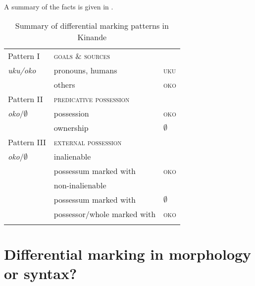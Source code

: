 \documentclass[output=paper]{langscibook}
\begin{document}
A summary of the facts is given in .

\begin{table}
\caption{Summary of differential marking patterns in Kinande}
\label{tab:schneider:SummaryDifferentialMarkingKinande}
 \begin{tabular}{lll}
  \lsptoprule
           Pattern I &  \textsc{goals \& sources} & \\
  \textit{uku/oko} & pronouns, humans & \textsc{uku}\\
  & others & \textsc{oko}\\
  \midrule
   Pattern II &  \textsc{predicative possession} & \\
   \textit{oko}/$\emptyset$ & possession & \textsc{oko} \\
   &  ownership & $\emptyset$\\
   \midrule
    Pattern III &  \textsc{external possession} & \\
    \textit{oko}/$\emptyset$ & inalienable &  \\
    & { } possessum marked with & \textsc{oko} \\
    & non-inalienable & \\
    & { } possessum marked with & $\emptyset$ \\
    & { } possessor/whole marked with & \textsc{oko}\\
  \lspbottomrule
 \end{tabular}
\end{table}
  	
   


\section{Differential marking in morphology or syntax?} \label{sec:schneider:section3}
\end{document}
